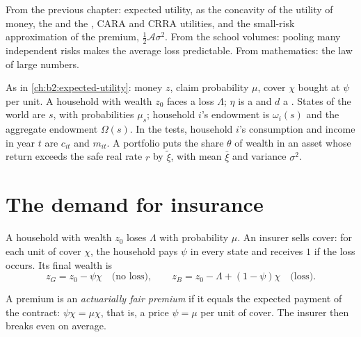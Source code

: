 \begin{recall}
From the previous chapter: expected utility,  as the concavity of the utility of money,
the  and the , CARA and CRRA utilities, and the small-risk
approximation of the premium, $\tfrac12\mathcal{A}\sigma^2$. From the school volumes: pooling many
independent risks makes the average loss predictable. From mathematics: the law of large numbers.
\end{recall}

\begin{notation}\label{not:b2:insurance-and-risk-sharing:symbols}
As in \cref{ch:b2:expected-utility}: money $z$, claim probability $\mu$, cover $\chi$ bought at $\psi$
per unit. A household with wealth $z_0$ faces a loss $\Lambda$; $\eta$ is a  and $d$ a
. States of the world are $s$, with probabilities $\mu_s$; household $i$'s endowment is
$\omega_i(s)$ and the aggregate endowment $\Omega(s)$. In the tests, household $i$'s consumption and
income in year $t$ are $c_{it}$ and $m_{it}$. A portfolio puts the share $\theta$ of wealth in an
asset whose return exceeds the safe real rate $r$ by $\tilde\xi$, with mean $\bar\xi$ and variance
$\sigma^2$.
\end{notation}

\section{The demand for insurance}\label{sec:b2:insurance-and-risk-sharing:demand}

A household with wealth $z_0$ loses $\Lambda$ with probability $\mu$. An insurer sells cover: for each
unit of cover $\chi$, the household pays $\psi$ in every state and receives $1$ if the loss occurs.
Its final wealth is
\[
z_G = z_0 - \psi\chi \quad\text{(no loss)}, \qquad z_B = z_0 - \Lambda + (1 - \psi)\chi \quad
\text{(loss)}.
\]

\begin{definition}\label{def:b2:insurance-and-risk-sharing:fair-premium}
A premium is an \emph{actuarially fair premium} if it equals the
expected payment of the contract: $\psi\chi = \mu\chi$, that is, a price $\psi = \mu$ per unit of
cover. The insurer then breaks even on average.
\end{definition}

